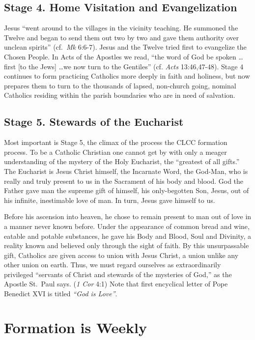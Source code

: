 \documentclass{article}
\begin{document}
\subsection{Stage 4. Home Visitation and Evangelization}

Jesus ``went around to the villages in the vicinity teaching. He summoned the
Twelve and began to send them out two by two and gave them authority over
unclean spirits'' (cf.\ \emph{Mk} 6:6-7). Jesus and the Twelve tried first to
evangelize the Chosen People. In Acts of the Apostles we read, ``the word of God
be spoken \ldots first [to the Jews] \ldots we now turn to the Gentiles''
(cf. \emph{Acts} 13:46,47-48). Stage 4 continues to form practicing Catholics
more deeply in faith and holiness, but now prepares them to turn to the
thousands of lapsed, non-church going, nominal Catholics residing within the
parish boundaries who are in need of salvation.

\subsection{Stage 5. Stewards of the Eucharist}

Most important is Stage 5, the climax of the process the CLCC formation
process. To be a Catholic Christian one cannot get by with only a meager
understanding of the mystery of the Holy Eucharist, the ``greatest of all
gifts.'' The Eucharist is Jesus Christ himself, the Incarnate Word, the God-Man,
who is really and truly present to us in the Sacrament of his body and
blood. God the Father gave man the supreme gift of himself, his only-begotten
Son, Jesus, out of his infinite, inestimable love of man. In turn, Jesus gave
himself to us.

Before his ascension into heaven, he chose to remain present to man out of love
in a manner never known before. Under the appearance of common bread and wine,
eatable and potable substances, he gave his Body and Blood, Soul and Divinity, a
reality known and believed only through the sight of faith. By this
unsurpassable gift, Catholics are given access to union with Jesus Christ, a
union unlike any other union on earth. Thus, we must regard ourselves as
extraordinarily privileged ``servants of Christ and stewards of the mysteries of
God,'' as the Apostle St.\ Paul says. (\emph{1 Cor} 4:1) Note that first
encyclical letter of Pope Benedict XVI is titled \emph{``God is Love''}.

\section{Formation is Weekly}
\end{document}
